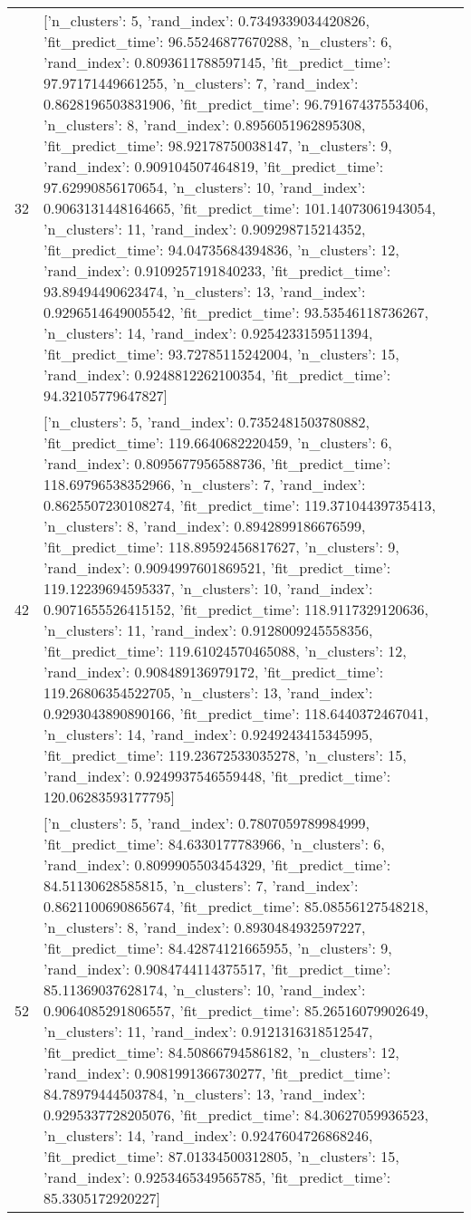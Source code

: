 \begin{tabular}{rl}
32 & [{'n_clusters': 5, 'rand_index': 0.7349339034420826, 'fit_predict_time': 96.55246877670288}, {'n_clusters': 6, 'rand_index': 0.8093611788597145, 'fit_predict_time': 97.97171449661255}, {'n_clusters': 7, 'rand_index': 0.8628196503831906, 'fit_predict_time': 96.79167437553406}, {'n_clusters': 8, 'rand_index': 0.8956051962895308, 'fit_predict_time': 98.92178750038147}, {'n_clusters': 9, 'rand_index': 0.909104507464819, 'fit_predict_time': 97.62990856170654}, {'n_clusters': 10, 'rand_index': 0.9063131448164665, 'fit_predict_time': 101.14073061943054}, {'n_clusters': 11, 'rand_index': 0.909298715214352, 'fit_predict_time': 94.04735684394836}, {'n_clusters': 12, 'rand_index': 0.9109257191840233, 'fit_predict_time': 93.89494490623474}, {'n_clusters': 13, 'rand_index': 0.9296514649005542, 'fit_predict_time': 93.53546118736267}, {'n_clusters': 14, 'rand_index': 0.9254233159511394, 'fit_predict_time': 93.72785115242004}, {'n_clusters': 15, 'rand_index': 0.9248812262100354, 'fit_predict_time': 94.32105779647827}] \\
42 & [{'n_clusters': 5, 'rand_index': 0.7352481503780882, 'fit_predict_time': 119.6640682220459}, {'n_clusters': 6, 'rand_index': 0.8095677956588736, 'fit_predict_time': 118.69796538352966}, {'n_clusters': 7, 'rand_index': 0.8625507230108274, 'fit_predict_time': 119.37104439735413}, {'n_clusters': 8, 'rand_index': 0.8942899186676599, 'fit_predict_time': 118.89592456817627}, {'n_clusters': 9, 'rand_index': 0.9094997601869521, 'fit_predict_time': 119.12239694595337}, {'n_clusters': 10, 'rand_index': 0.9071655526415152, 'fit_predict_time': 118.9117329120636}, {'n_clusters': 11, 'rand_index': 0.9128009245558356, 'fit_predict_time': 119.61024570465088}, {'n_clusters': 12, 'rand_index': 0.908489136979172, 'fit_predict_time': 119.26806354522705}, {'n_clusters': 13, 'rand_index': 0.9293043890890166, 'fit_predict_time': 118.6440372467041}, {'n_clusters': 14, 'rand_index': 0.9249243415345995, 'fit_predict_time': 119.23672533035278}, {'n_clusters': 15, 'rand_index': 0.9249937546559448, 'fit_predict_time': 120.06283593177795}] \\
52 & [{'n_clusters': 5, 'rand_index': 0.7807059789984999, 'fit_predict_time': 84.6330177783966}, {'n_clusters': 6, 'rand_index': 0.8099905503454329, 'fit_predict_time': 84.51130628585815}, {'n_clusters': 7, 'rand_index': 0.8621100690865674, 'fit_predict_time': 85.08556127548218}, {'n_clusters': 8, 'rand_index': 0.8930484932597227, 'fit_predict_time': 84.42874121665955}, {'n_clusters': 9, 'rand_index': 0.9084744114375517, 'fit_predict_time': 85.11369037628174}, {'n_clusters': 10, 'rand_index': 0.9064085291806557, 'fit_predict_time': 85.26516079902649}, {'n_clusters': 11, 'rand_index': 0.9121316318512547, 'fit_predict_time': 84.50866794586182}, {'n_clusters': 12, 'rand_index': 0.9081991366730277, 'fit_predict_time': 84.78979444503784}, {'n_clusters': 13, 'rand_index': 0.9295337728205076, 'fit_predict_time': 84.30627059936523}, {'n_clusters': 14, 'rand_index': 0.9247604726868246, 'fit_predict_time': 87.01334500312805}, {'n_clusters': 15, 'rand_index': 0.9253465349565785, 'fit_predict_time': 85.3305172920227}] \\

\end{tabular}
